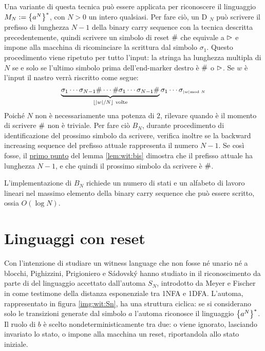 Una variante di questa tecnica può essere applicata per riconoscere il linguaggio $M_N:=\left\{ a^N \right\}^*$, con $N>0$ un intero qualsiasi. Per fare ciò, un D $_N$ può scrivere il prefisso di lunghezza $N-1$ della binary carry sequence con la tecnica descritta precedentemente, quindi scrivere un simbolo di reset $\#$ che equivale a $\rhd$ e impone alla macchina di ricominciare la scrittura dal simbolo $\sigma_1$. Questo procedimento viene ripetuto per tutto l'input: la stringa ha lunghezza multipla di $N$ se e solo se l'ultimo simbolo prima dell'end-marker destro è $\#$ o $\rhd$. Se $w$ è l'input il nastro verrà riscritto come segue:
\begin{equation*}
	\underbrace{\sigma_1\cdots\sigma_{N-1}\#\cdots\#\sigma_1\cdots\sigma_{N-1}\#}_{\lfloor |w|/N \rfloor \text{ volte}}\sigma_1\cdots\sigma_{\scriptscriptstyle |w|\mkern -11mu \mod N}
\end{equation*}
Poiché $N$ non è necessariamente una potenza di $2$, rilevare quando è il momento di scrivere $\#$ non è triviale. Per fare ciò $B_N$, durante procedimento di identificazione del prossimo simbolo da scrivere, verifica inoltre se la backward increasing sequence del prefisso attuale rappresenta il numero $N-1$. Se così fosse, il \hyperref[lem:wit:bis:1]{primo punto} del lemma \ref{lem:wit:bis} dimostra che il prefisso attuale ha lunghezza $N-1$, e che quindi il prossimo simbolo da scrivere è $\#$.

L'implementazione di $B_N$ richiede un numero di stati e un alfabeto di lavoro lineari nel massimo elemento della binary carry sequence che può essere scritto, ossia $O(\log N)$.




\section{Linguaggi con reset}
Con l'intenzione di studiare un witness language che non fosse né unario né a blocchi, Pighizzini, Prigioniero e Sádovský hanno studiato in \cite{Pighizzini:22:limitedwitness} il riconoscimento da parte di  del linguaggio accettato dall'automa $S_N$, introdotto da Meyer e Fischer in \cite{Meyer:71:ecodescription} come testimone della distanza esponenziale tra 1NFA e 1DFA. L'automa, rappresentato in figura \ref{img:wit:Sn}, ha una struttura ciclica: se si considerano solo le transizioni generate dal simbolo $a$ l'automa riconosce il linguaggio $\left\{ a^N \right\}^*$. Il ruolo di $b$ è scelto nondeterministicamente tra due: o viene ignorato, lasciando invariato lo stato, o impone alla macchina un reset, riportandola allo stato iniziale.


